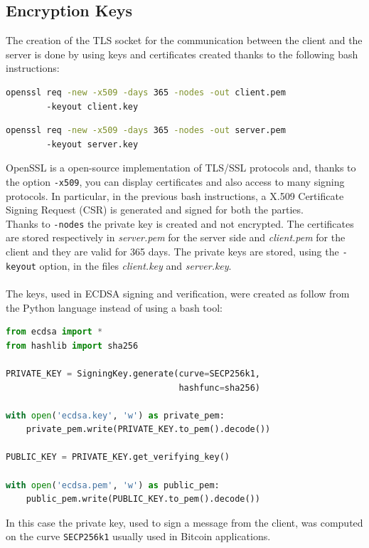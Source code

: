 \subsection{Encryption Keys}
The creation of the TLS socket for the communication between the client and the server is done by using keys and certificates created thanks to the following bash instructions:
\vspace{0.3cm}
\begin{lstlisting}[language=bash, showstringspaces=false, tabsize=4]
openssl req -new -x509 -days 365 -nodes -out client.pem
		-keyout client.key
\end{lstlisting}
\begin{lstlisting}[language=bash, showstringspaces=false, tabsize=4]
openssl req -new -x509 -days 365 -nodes -out server.pem 
		-keyout server.key
\end{lstlisting}
OpenSSL is a open-source implementation of TLS/SSL protocols and, thanks to the option \texttt{-x509}, you can display certificates and also access to many signing protocols.
In particular, in the previous bash instructions, a X.509 Certificate Signing Request (CSR) is generated and signed for both the parties.\\
Thanks to \texttt{-nodes} the private key is created and not encrypted. The certificates are stored respectively in \textit{server.pem} for the server side and \textit{client.pem} for the client and they are valid for 365 days. The private keys are stored, using the \texttt{-keyout} option, in the files \textit{client.key} and \textit{server.key}.\\\\
The keys, used in ECDSA signing and verification, were created as follow from the Python language instead of using a bash tool:
\vspace{0.3cm}
\begin{lstlisting}[language=python, showstringspaces=false, tabsize=4]
from ecdsa import *
from hashlib import sha256

PRIVATE_KEY = SigningKey.generate(curve=SECP256k1,
                                  hashfunc=sha256)

with open('ecdsa.key', 'w') as private_pem:
	private_pem.write(PRIVATE_KEY.to_pem().decode())

PUBLIC_KEY = PRIVATE_KEY.get_verifying_key()

with open('ecdsa.pem', 'w') as public_pem:
	public_pem.write(PUBLIC_KEY.to_pem().decode())
\end{lstlisting}
In this case the private key, used to sign a message from the client, was computed on the curve \texttt{SECP256k1} usually used in Bitcoin applications.
